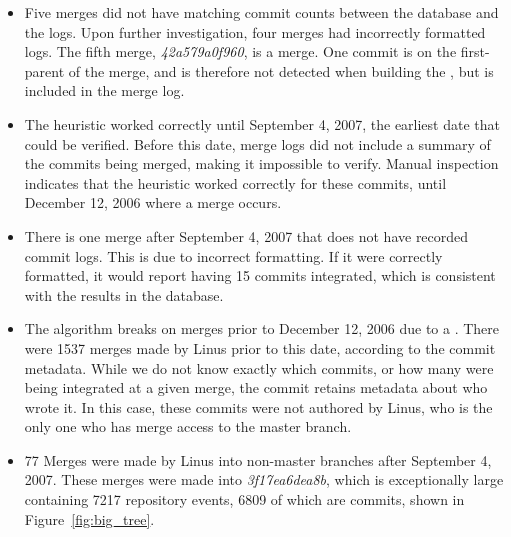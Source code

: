 \begin{itemize}
  \item

    Five merges did not have matching commit counts between the database
    and the logs. Upon further investigation, four merges had
    incorrectly formatted logs. The fifth merge,
    \emph{42a579a0f960}, is a \foxtrot{}
    merge. One commit is on the first-parent of the merge, and is
    therefore not detected when building the \mt{}, but is included
    in the merge log.

  \item

    The heuristic worked correctly until September 4, 2007, the earliest
    date that could be verified. Before this date, merge logs did not
    include a summary of the commits being merged, making it impossible
    to verify. Manual inspection indicates that the heuristic worked
    correctly for these commits, until December 12, 2006 where a
    \foxtrot{} merge occurs.

  \item

    There is one merge after September 4, 2007
    that does not have recorded commit logs.
    This is due to incorrect formatting.
    If it were correctly formatted, it would report having 15 commits integrated,
    which is consistent with the results in the database.

  \item

    The algorithm breaks on merges prior to December 12, 2006 due to a
    \foxtrot{}. There were 1537 merges made by Linus prior to this date,
    according to the commit metadata.
    While we do not know exactly which commits, or how many were being
    integrated at a given merge, the commit retains metadata about who
    wrote it. In this case, these commits were not authored by Linus,
    who is the only one who has merge access to the master branch.

  \item

    77 Merges were made by Linus into non-master branches after
    September 4, 2007. These merges were made into
    \emph{3f17ea6dea8b}, which is
    exceptionally large containing 7217 repository events, 6809 of
    which are commits, shown in Figure~\ref{fig:big_tree}.

\end{itemize}

